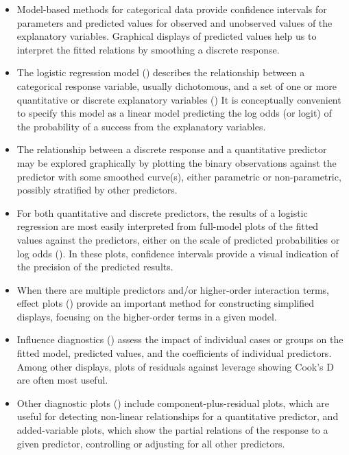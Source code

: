 \begin{itemize}
\item Model-based methods for categorical data provide confidence intervals
for parameters and predicted values for observed and unobserved values
of the explanatory variables.  Graphical displays of predicted values
help us to interpret the fitted relations by smoothing a discrete response.

\item The logistic regression model ()
describes the relationship between
a categorical response variable, usually dichotomous,
and a set of one or more quantitative or discrete explanatory variables
()
It is conceptually
convenient to specify this model as a linear model predicting
the log odds (or logit) of the probability of a success
from the explanatory variables.

\item The relationship between a discrete response and a quantitative predictor
may be explored graphically by plotting the binary observations
against the predictor with some smoothed curve(s), either parametric
or non-parametric, possibly stratified by
other predictors.


\item For both quantitative and discrete predictors, the results of
a logistic regression are most easily interpreted from full-model plots of
the fitted values against the predictors,
either on the scale of predicted probabilities or log odds
().
In these plots, confidence intervals provide a visual indication
of the precision of the predicted results.

\item When there are multiple predictors and/or higher-order
interaction terms,
effect plots ()
provide an important
method for constructing simplified displays, focusing on the
higher-order terms in a given model.

\item Influence diagnostics ()
assess the impact of individual cases or
groups on the fitted model, predicted values, and the coefficients of individual predictors.
Among other displays, plots of residuals against leverage showing Cook's D are
often most useful.

\item Other diagnostic plots ()
include component-plus-residual plots,
which are useful for detecting non-linear relationships for a quantitative predictor,
and added-variable plots, which show the partial relations of the response to a
given predictor, controlling or adjusting for all other predictors.


\end{itemize}
